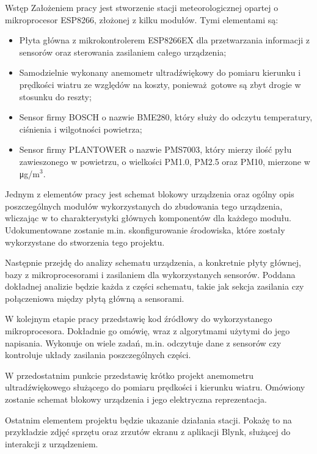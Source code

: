 \documentclass[12pt,a4paper]{scrartcl}
\begin{document}
\begin{section}	{\fontsize{14pt}{16.8pt} \tytulyrozdzialow Wstęp}
	\hspace{\parindent} Założeniem pracy jest stworzenie stacji meteorologicznej opartej o mikroprocesor ESP8266, złożonej z kilku modułów. Tymi elementami są:
	\begin{itemize}{}{}
		\item Płyta główna z mikrokontrolerem ESP8266EX dla przetwarzania informacji z sensorów oraz sterowania zasilaniem całego urządzenia;
		\item Samodzielnie wykonany anemometr ultradźwiękowy do pomiaru kierunku i prędkości wiatru ze względów na koszty, ponieważ gotowe są zbyt drogie w stosunku do reszty;
		\item Sensor firmy BOSCH o nazwie BME280, który służy do odczytu temperatury, ciśnienia i wilgotności powietrza;
		\item Sensor firmy PLANTOWER o nazwie PMS7003, który mierzy ilość pyłu zawieszonego w powietrzu, o wielkości PM1.0, PM2.5 oraz PM10, mierzone w \si\micro g/m$^{3}$.
	\end{itemize}
	\par Jednym z elementów pracy jest schemat blokowy urządzenia oraz ogólny opis poszczególnych modułów wykorzystanych do zbudowania tego urządzenia, wliczając w to charakterystyki głównych komponentów dla każdego modułu. Udokumentowane zostanie m.in. skonfigurowanie środowiska, które zostały wykorzystane do stworzenia tego projektu.
	\par Następnie przejdę do analizy schematu urządzenia, a konkretnie płyty głównej, bazy z mikroprocesorami i zasilaniem dla wykorzystanych sensorów. Poddana dokładnej analizie będzie każda z części schematu, takie jak sekcja zasilania czy połączeniowa między płytą główną a sensorami.
	\par W kolejnym etapie pracy przedstawię kod źródłowy do wykorzystanego mikroprocesora. Dokładnie go omówię, wraz z algorytmami użytymi do jego napisania. Wykonuje on wiele zadań, m.in. odczytuje dane z sensorów czy kontroluje układy zasilania poszczególnych części.
	\par W przedostatnim punkcie przedstawię krótko projekt anemometru ultradźwiękowego służącego do pomiaru prędkości i kierunku wiatru. Omówiony zostanie schemat blokowy urządzenia i jego elektryczna reprezentacja.
	\par Ostatnim elementem projektu będzie ukazanie działania stacji. Pokażę to na przykładzie zdjęć sprzętu oraz zrzutów ekranu z aplikacji Blynk, służącej do interakcji z urządzeniem.
\end{section}
\end{document}
